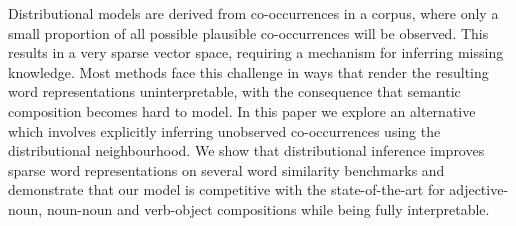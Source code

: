 Distributional models are derived from co-occurrences in a corpus, where only a small proportion of all possible plausible co-occurrences will be observed. This results in a very sparse vector space, requiring a mechanism for inferring missing knowledge. Most methods face this challenge in ways that render the resulting word representations uninterpretable, with the consequence that semantic composition becomes hard to model. In this paper we explore an alternative which involves explicitly inferring unobserved co-occurrences using the distributional neighbourhood. We show that distributional inference improves sparse word representations on several word similarity benchmarks and demonstrate that our model is competitive with the state-of-the-art for adjective-noun, noun-noun and verb-object compositions while being fully interpretable.
